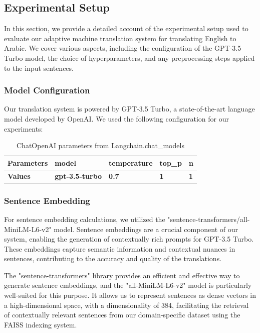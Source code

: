 \documentclass[12pt]{article}
\begin{document}
\subsection{Experimental Setup}

In this section, we provide a detailed account of the experimental setup used to evaluate our adaptive machine translation system for translating English to Arabic. We cover various aspects, including the configuration of the GPT-3.5 Turbo model, the choice of hyperparameters, and any preprocessing steps applied to the input sentences.

\subsubsection{Model Configuration}

Our translation system is powered by GPT-3.5 Turbo, a state-of-the-art language model developed by OpenAI. We used the following configuration for our experiments:


\begin{table}[h]
	\centering
	\begin{tabular}{|p{4cm}|p{3cm}|p{2.5cm}|p{2cm}|p{1cm}|}
		\hline
		\textbf{Parameters} & \textbf{model} & \textbf{temperature} & \textbf{top\_p} & \textbf{n}\\
		\hline
		\textbf{Values} & \textbf{gpt-3.5-turbo} & \textbf{0.7}  & \textbf{1}  & \textbf{1}\\
		\hline
	\end{tabular}
	\caption{ChatOpenAI parameters from Langchain.chat\_models}
	\label{table:param_values}
\end{table}


\subsubsection{Sentence Embedding}

For sentence embedding calculations, we utilized the "sentence-transformers/all-MiniLM-L6-v2" model. Sentence embeddings are a crucial component of our system, enabling the generation of contextually rich prompts for GPT-3.5 Turbo. These embeddings capture semantic information and contextual nuances in sentences, contributing to the accuracy and quality of the translations.

The "sentence-transformers" library provides an efficient and effective way to generate sentence embeddings, and the "all-MiniLM-L6-v2" model is particularly well-suited for this purpose. It allows us to represent sentences as dense vectors in a high-dimensional space, with a dimensionality of 384, facilitating the retrieval of contextually relevant sentences from our domain-specific dataset using the FAISS indexing system.
\end{document}
